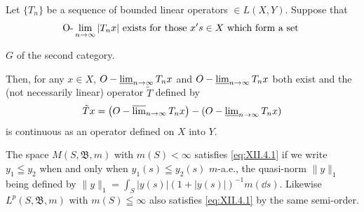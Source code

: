 Let $\{T_n\}$ be a sequence of bounded linear operators $\in L(X, Y)$. Suppose that 
\begin{equation}\label{eq:XII.4.2}
\Olim _{n \to \infty} | T _{n} x | \text{ exists for those } x ^{\prime} s \in X \text{ which form a set }
\end{equation}

$G$ of the second category. 

Then, for any $x \in X$, $O - \varliminf\limits_{n \to \infty} T_n x$ and $O - \varliminf\limits_{n \to \infty} T_n x$ both exist and the (not necessarily linear) operator $\tilde{T}$ defined by 
\begin{equation}\label{eq:XII.4.3}
\tilde {T} x = \left(O - \varlimsup\limits_{n \rightarrow \infty} T _{n} x\right) - \left(O - \varliminf\limits_{n \rightarrow \infty} T _{n} x\right)
\end{equation}
is continuous as an operator defined on $X$ into $Y$. 

\begin{remarku} The space $M(S, \mathfrak{B}, m)$ with $m(S) < \infty$ satisfies \eqref{eq:XII.4.1} if we write $y_1 \leqq y_2$ when and only when $y_1(s) \leqq y_2(s)$ $m$-a.e., the quasi-norm $\|y\|_1$ being defined by $\|y\|_1 = \int_S |y(s)|(1 + |y(s)|)^{-1} m(\dd s)$. Likewise $L^p(S, \mathfrak{B}, m)$ with $m(S) \leqq \infty$ also satisfies \eqref{eq:XII.4.1} by the same semi-order. 
\end{remarku}

